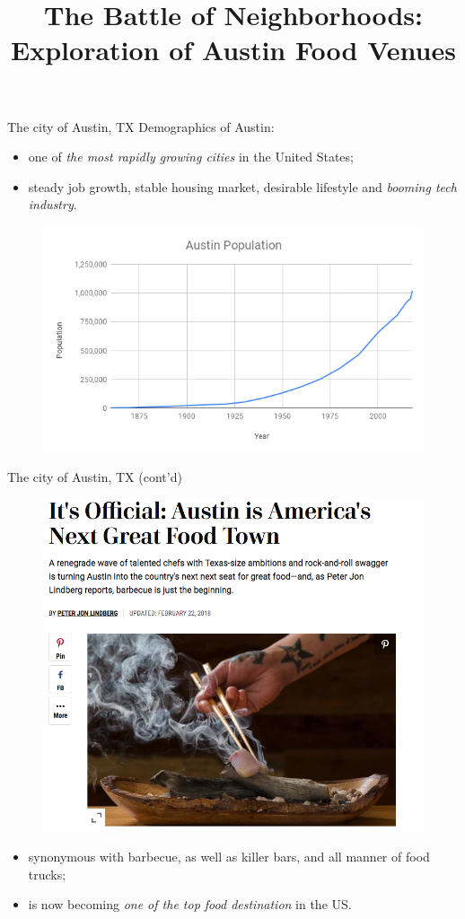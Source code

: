 \documentclass{beamer}
\title[The Battle of Neighborhoods]
{The Battle of Neighborhoods: \\
Exploration of Austin Food Venues}
\date[\today]
\begin{document}
  \maketitle
  \begin{frame}{The city of Austin, TX}
  Demographics  of Austin:
    \begin{itemize}
    \item[\EightStarTaper] one of {\it the most rapidly growing cities} in the United States;
    \item[\EightStarTaper] steady job growth, stable housing market, desirable lifestyle and  {\it booming tech industry}.
      \end{itemize}
      \begin{figure}[ht!]
	\centering
	\includegraphics[width=.8\textwidth]{pics/austin_growth}
\end{figure}

  \end{frame}
    \begin{frame}{The city of Austin, TX (cont'd)}
     \begin{figure}[ht!]
	\centering
	\includegraphics[width=.6 \textwidth]{pics/title}
\end{figure}
    \begin{itemize}
    \item[\EightStarTaper] synonymous with barbecue, as well as killer bars, and all manner of food trucks;
    \item[\EightStarTaper] is now becoming {\it one of the top food destination} in the US.
      \end{itemize}
  \end{frame}
\end{document}
